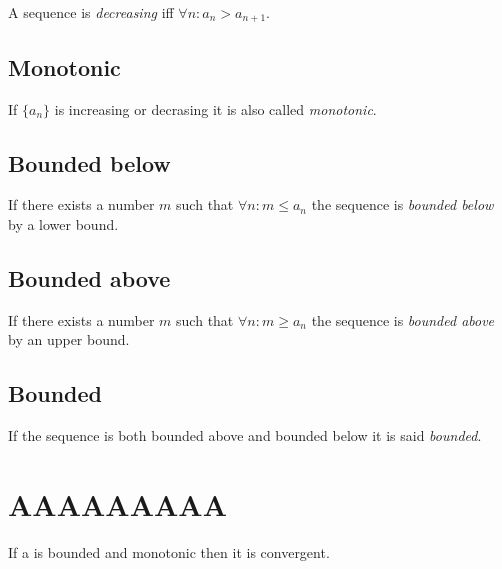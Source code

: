 \documentclass{article}
\begin{document}
A sequence is \textit{decreasing} iff \(\forall n:  a_n>a_{n+1}\).

\subsection{Monotonic}

If \(\{a_n\}\) is increasing or decrasing it is also called \textit{monotonic}.

\subsection{Bounded below}

If there exists a number \(m\) such that \(\forall n : m \leq a_n\)
the sequence is \textit{bounded below} by a lower bound.

\subsection{Bounded above}

If there exists a number \(m\) such that \(\forall n : m \geq a_n\)
the sequence is \textit{bounded above} by an upper bound.

\subsection{Bounded}

If the sequence is both bounded above and bounded below it is
said \textit{bounded}.

\section{AAAAAAAAA}

If a is bounded and monotonic then it is convergent.

\pagebreak
\end{document}
